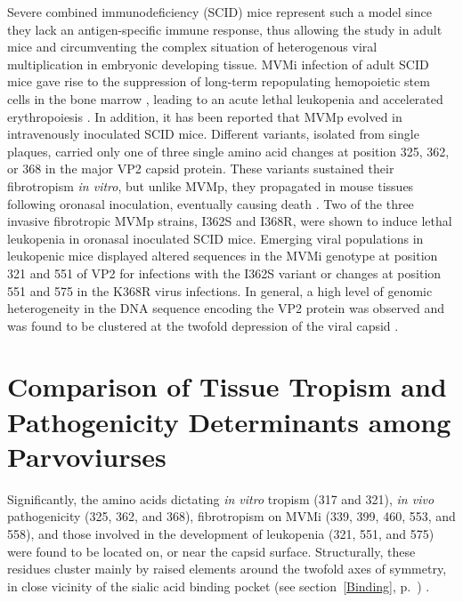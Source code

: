 Severe combined immunodeficiency (SCID) mice \cite{pmid6823332} represent such a model since they lack an antigen-specific immune response, thus allowing the study in adult mice and circumventing the complex situation of heterogenous viral multiplication in embryonic developing tissue. MVMi infection of adult SCID mice gave rise to the suppression of long-term repopulating hemopoietic stem cells in the bone marrow \cite{pmid12857918}, leading to an acute lethal leukopenia and accelerated erythropoiesis \cite{pmid9971754}.
In addition, it has been reported that MVMp evolved in intravenously inoculated SCID mice. Different variants, isolated from single plaques, carried only one of three single amino acid changes at position 325, 362, or 368 in the major VP2 capsid protein. These variants sustained their fibrotropism \textit{in vitro}, but unlike MVMp, they propagated in mouse tissues following oronasal inoculation, eventually causing death \cite{pmid16415031, pmid16103180}.
Two of the three invasive fibrotropic MVMp strains, I362S and I368R, were shown to induce lethal leukopenia in oronasal inoculated SCID mice. Emerging viral populations in leukopenic mice displayed altered sequences in the MVMi genotype at position 321 and 551 of VP2 for infections with the I362S variant or changes at position 551 and 575 in the K368R virus infections. In general, a high level of genomic heterogeneity in the DNA sequence encoding the VP2 protein was observed and was found to be clustered at the twofold depression of the viral capsid \cite{pmid18045943}.            	
	
	
\section{Comparison of Tissue Tropism and Pathogenicity Determinants among Parvoviurses}	
	
	Significantly, the amino acids dictating \textit{in vitro} tropism (317 and 321), \textit{in vivo} pathogenicity (325, 362, and 368), fibrotropism on MVMi (339, 399, 460, 553, and 558), and those involved in the development of leukopenia (321, 551, and 575) were found to be located on, or near the capsid surface. Structurally, these residues cluster mainly by raised elements around the twofold axes of symmetry, in close vicinity of the sialic acid binding pocket (see section~\ref{Binding}, p.~\pageref{Binding}) \cite{pmid16415031, pmid18045943}.   
	
